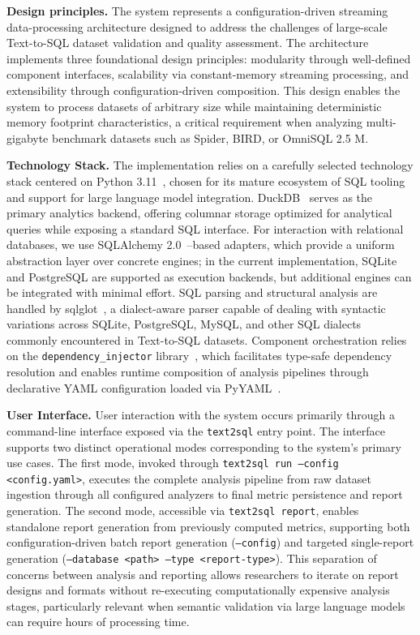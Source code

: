 \documentclass[]{einformatica}
\begin{document}
\textbf{Design principles.} The system represents a configuration-driven streaming data-processing architecture designed to address the challenges of large-scale Text-to-SQL dataset validation and quality assessment. The architecture implements three foundational design principles: modularity through well-defined component interfaces, scalability via constant-memory streaming processing, and extensibility through configuration-driven composition. This design enables the system to process datasets of arbitrary size while maintaining deterministic memory footprint characteristics, a critical requirement when analyzing multi-gigabyte benchmark datasets such as Spider, BIRD, or OmniSQL 2.5 M.

\textbf{Technology Stack.} The implementation relies on a carefully selected technology stack centered on Python 3.11~\cite{pythonDocs311}, chosen for its mature ecosystem of SQL tooling and support for large language model integration. DuckDB~\cite{duckdbDocs} serves as the primary analytics backend, offering columnar storage optimized for analytical queries while exposing a standard SQL interface. For interaction with relational databases, we use SQLAlchemy 2.0~\cite{sqlalchemyDocs20}--based adapters, which provide a uniform abstraction layer over concrete engines; in the current implementation, SQLite and PostgreSQL are supported as execution backends, but additional engines can be integrated with minimal effort. SQL parsing and structural analysis are handled by sqlglot~\cite{sqlglotRepo}, a dialect-aware parser capable of dealing with syntactic variations across SQLite, PostgreSQL, MySQL, and other SQL dialects commonly encountered in Text-to-SQL datasets. Component orchestration relies on the \texttt{dependency\_injector} library~\cite{dependencyInjectorDocs}, which facilitates type-safe dependency resolution and enables runtime composition of analysis pipelines through declarative YAML configuration loaded via PyYAML~\cite{pyyaml}. 

\textbf{User Interface.} User interaction with the system occurs primarily through a command-line interface exposed via the \texttt{text2sql} entry point. The interface supports two distinct operational modes corresponding to the system's primary use cases. The first mode, invoked through \texttt{text2sql run --config <config.yaml>}, executes the complete analysis pipeline from raw dataset ingestion through all configured analyzers to final metric persistence and report generation. The second mode, accessible via \texttt{text2sql report}, enables standalone report generation from previously computed metrics, supporting both configuration-driven batch report generation (\texttt{--config}) and targeted single-report generation (\texttt{--database <path> --type <report-type>}). This separation of concerns between analysis and reporting allows researchers to iterate on report designs and formats without re-executing computationally expensive analysis stages, particularly relevant when semantic validation via large language models can require hours of processing time.
\end{document}

